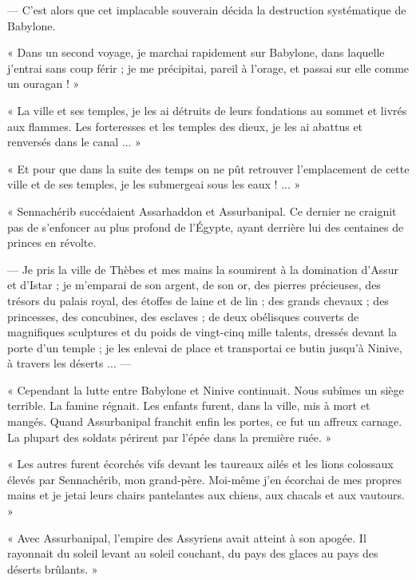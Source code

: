 \documentclass[a4paper, 11pt, oneside, polutonikogreek, french]{article}
\begin{document}
--- C'est alors que cet implacable souverain décida la destruction systématique de Babylone.

« Dans un second voyage, je marchai rapidement sur Babylone, dans laquelle j'entrai sans coup férir ; je me précipitai, pareil à l'orage, et passai sur elle comme un ouragan ! »

« La ville et ses temples, je les ai détruits de leurs fondations au sommet et livrés aux flammes. Les forteresses et les temples des dieux, je les ai abattus et renversés dans le canal ... »

« Et pour que dans la suite des temps on ne pût retrouver l'emplacement de cette ville et de ses temples, je les submergeai sous les eaux ! ... »

\bigskip
\centerline{\EightStarTaper}
\centerline{\EightStarTaper\EightStarTaper}
\bigskip

« Sennachérib succédaient Assarhaddon et Assurbanipal. Ce dernier ne craignit pas de s'enfoncer au plus profond de l'Égypte, ayant derrière lui des centaines de princes en révolte.

--- Je pris la ville de Thèbes et mes mains la soumirent à la domination d'Assur et d'Istar ; je m'emparai de son argent, de son or, des pierres précieuses, des trésors du palais royal, des étoffes de laine et de lin ; des grands chevaux ; des princesses, des concubines, des esclaves ; de deux obélisques couverts de magnifiques sculptures et du poids de vingt-cinq mille talents, dressés devant la porte d'un temple ; je les enlevai de place et transportai ce butin jusqu'à Ninive, à travers les déserts ... ---

« Cependant la lutte entre Babylone et Ninive continuait. Nous subîmes un siège terrible. La famine régnait. Les enfants furent, dans la ville, mis à mort et mangés. Quand Assurbanipal franchit enfin les portes, ce fut un affreux carnage. La plupart des soldats périrent par l'épée dans la première ruée. »

« Les autres furent écorchés vifs devant les taureaux ailés et les lions colossaux élevés par Sennachérib, mon grand-père. Moi-même j'en écorchai de mes propres mains et je jetai leurs chairs pantelantes aux chiens, aux chacals et aux vautours. »

\bigskip
\centerline{\EightStarTaper}
\centerline{\EightStarTaper\EightStarTaper}
\bigskip

« Avec Assurbanipal, l'empire des Assyriens avait atteint à son apogée. Il rayonnait du soleil levant au soleil couchant, du pays des glaces au pays des déserts brûlants. »
\end{document}
